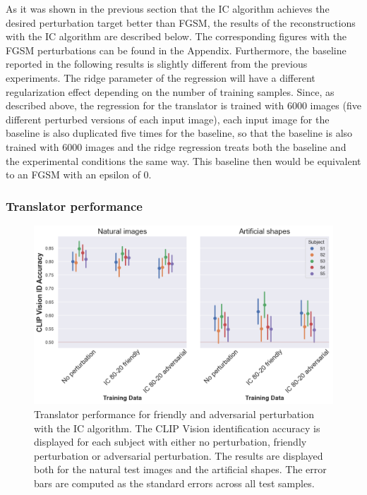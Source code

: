 As it was shown in the previous section that the IC algorithm achieves the desired perturbation target better than FGSM, the results of the reconstructions with the IC algorithm are described below. The corresponding figures with the FGSM perturbations can be found in the Appendix. Furthermore, the baseline reported in the following results is slightly different from the previous experiments. The ridge parameter of the regression will have a different regularization effect depending on the number of training samples. Since, as described above, the regression for the translator is trained with 6000 images (five different perturbed versions of each input image), each input image for the baseline is also duplicated five times for the baseline, so that the baseline is also trained with 6000 images and the ridge regression treats both the baseline and the experimental conditions the same way. This baseline then would be equivalent to an FGSM with an epsilon of 0. 

\subsubsection{Translator performance}

\begin{figure}[ht]
    \centering
    \includegraphics[width=1\textwidth]{plots/advpert_translator_ic_80-20.png}
    \caption[Experiment 3: Translator performance]{Translator performance for friendly and adversarial perturbation with the IC algorithm. The CLIP Vision identification accuracy is displayed for each subject with either no perturbation, friendly perturbation or adversarial perturbation. The results are displayed both for the natural test images and the artificial shapes. The error bars are computed as the standard errors across all test samples.}\label{fig:advpert_translator_ic_80}
\end{figure}

